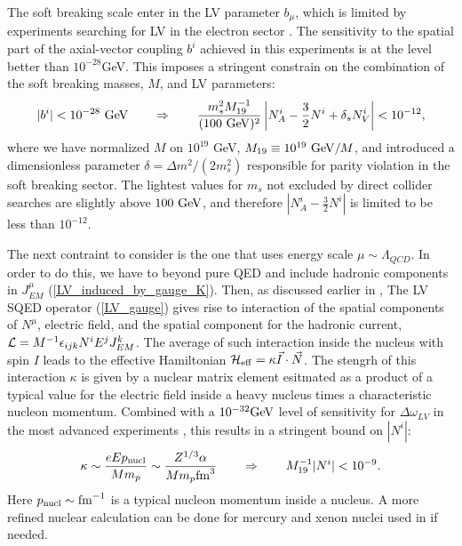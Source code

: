 \documentclass[12pt]{revtex4}
\begin{document}
The soft  breaking scale enter in the LV parameter $b_\mu$, which is 
limited by  experiments searching for LV in the electron sector 
\cite{Heckel:1999sy}. The sensitivity to the spatial part of the axial-vector 
coupling $b^i$ achieved in this experiments is at the level better than $10^{-28}$GeV. 
This imposes a stringent constrain on the combination of the soft breaking masses,
$M$, and LV parameters:
\begin{equation}
|b^i|<10^{-28}~{\rm GeV}
\qquad \Rightarrow \qquad
\frac{m_{s}^2M_{19}^{-1}}{(100~{\rm GeV})^2}
\left| N_A^i - \frac{3}{2} N^i + \delta_{s} N_V^i \right |< 10^{-12},
\label{b_limit}
\end{equation}
where we have normalized $M$ on $10^{19}$ GeV, $M_{19}\equiv 10^{19}~{\rm GeV}/M$, and introduced 
a dimensionless parameter $\delta = \Delta m^2/(2m_s^2)$ responsible for parity violation
in the soft breaking sector. 
The lightest values for $m_s$ not excluded by direct collider searches are slightly above $100~{\rm GeV}$, 
and therefore $|N_A^i - \frac{3}{2} N^i |$ is limited to be less than $10^{-12}$. 


The next contraint to consider is the one that uses energy scale $\mu \sim \Lambda_{QCD}$. 
In order to do this, we have to beyond pure QED and include hadronic components 
in $J^\mu_{EM}$ (\ref{LV_induced_by_gauge_K}). Then, as discussed earlier in 
\cite{GrootNibbelink:2004za}, The LV SQED operator (\ref{LV_gauge}) gives rise to 
interaction of the spatial components of $N^\mu$, electric field, and the spatial component 
for the hadronic current, ${\cal L} = M^{-1}\epsilon_{ijk} N^i E^j J_{EM}^k$.
The average of such interaction inside the nucleus with spin $I$ leads to 
the effective Hamiltonian $\mathcal{H}_{\rm eff}= \kappa \vec I\cdot \vec N$.
The stengrh of this
interaction $\kappa$ is given by a nuclear matrix element esitmated as a 
product of a typical value for the electric field inside a heavy nucleus times a characteristic 
nucleon momentum. Combined with a $10^{-32} {\rm GeV}$ level of sensitivity for 
$\Delta \omega_{LV}$ in the most advanced experiments \cite{clock1,clock2},
this results in a stringent bound on $|N^i|$:
\begin{equation}
\kappa \sim \frac{eE p_{\rm nucl}}{Mm_p} \sim \frac{Z^{1/3}\alpha}{M m_p{\rm fm}^3} \qquad \Rightarrow \qquad
M_{19}^{-1}|N^i|< 10^{-9}.
\label{N_limit_nucl}
\end{equation}
Here $p_{\rm nucl}\sim {\rm fm}^{-1}$ is a typical nucleon momentum
inside a nucleus. A more refined nuclear calculation can be done 
for mercury and xenon nuclei used in \cite{clock1,clock2} if needed.
\end{document}
